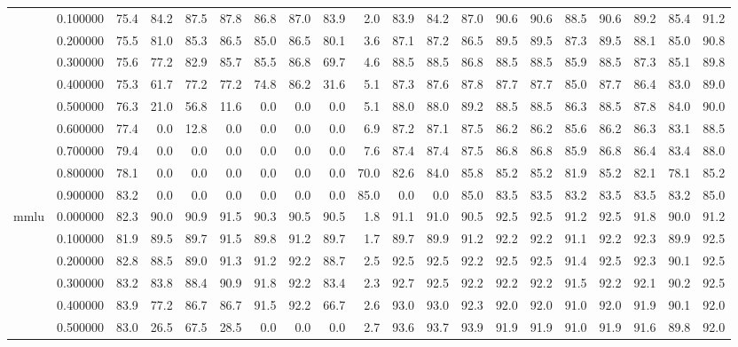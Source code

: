 \begin{tabular}{llrrrrrrrrrrrrrrrrrr}
 & 0.100000 & 75.4 & 84.2 & 87.5 & 87.8 & 86.8 & 87.0 & 83.9 & 2.0 & 83.9 & 84.2 & 87.0 & 90.6 & 90.6 & 88.5 & 90.6 & 89.2 & 85.4 & 91.2 \\
 & 0.200000 & 75.5 & 81.0 & 85.3 & 86.5 & 85.0 & 86.5 & 80.1 & 3.6 & 87.1 & 87.2 & 86.5 & 89.5 & 89.5 & 87.3 & 89.5 & 88.1 & 85.0 & 90.8 \\
 & 0.300000 & 75.6 & 77.2 & 82.9 & 85.7 & 85.5 & 86.8 & 69.7 & 4.6 & 88.5 & 88.5 & 86.8 & 88.5 & 88.5 & 85.9 & 88.5 & 87.3 & 85.1 & 89.8 \\
 & 0.400000 & 75.3 & 61.7 & 77.2 & 77.2 & 74.8 & 86.2 & 31.6 & 5.1 & 87.3 & 87.6 & 87.8 & 87.7 & 87.7 & 85.0 & 87.7 & 86.4 & 83.0 & 89.0 \\
 & 0.500000 & 76.3 & 21.0 & 56.8 & 11.6 & 0.0 & 0.0 & 0.0 & 5.1 & 88.0 & 88.0 & 89.2 & 88.5 & 88.5 & 86.3 & 88.5 & 87.8 & 84.0 & 90.0 \\
 & 0.600000 & 77.4 & 0.0 & 12.8 & 0.0 & 0.0 & 0.0 & 0.0 & 6.9 & 87.2 & 87.1 & 87.5 & 86.2 & 86.2 & 85.6 & 86.2 & 86.3 & 83.1 & 88.5 \\
 & 0.700000 & 79.4 & 0.0 & 0.0 & 0.0 & 0.0 & 0.0 & 0.0 & 7.6 & 87.4 & 87.4 & 87.5 & 86.8 & 86.8 & 85.9 & 86.8 & 86.4 & 83.4 & 88.0 \\
 & 0.800000 & 78.1 & 0.0 & 0.0 & 0.0 & 0.0 & 0.0 & 0.0 & 70.0 & 82.6 & 84.0 & 85.8 & 85.2 & 85.2 & 81.9 & 85.2 & 82.1 & 78.1 & 85.2 \\
 & 0.900000 & 83.2 & 0.0 & 0.0 & 0.0 & 0.0 & 0.0 & 0.0 & 85.0 & 0.0 & 0.0 & 85.0 & 83.5 & 83.5 & 83.2 & 83.5 & 83.5 & 83.2 & 85.0 \\
\cline{1-20}
\multirow[t]{10}{*}{mmlu} & 0.000000 & 82.3 & 90.0 & 90.9 & 91.5 & 90.3 & 90.5 & 90.5 & 1.8 & 91.1 & 91.0 & 90.5 & 92.5 & 92.5 & 91.2 & 92.5 & 91.8 & 90.0 & 91.2 \\
 & 0.100000 & 81.9 & 89.5 & 89.7 & 91.5 & 89.8 & 91.2 & 89.7 & 1.7 & 89.7 & 89.9 & 91.2 & 92.2 & 92.2 & 91.1 & 92.2 & 92.3 & 89.9 & 92.5 \\
 & 0.200000 & 82.8 & 88.5 & 89.0 & 91.3 & 91.2 & 92.2 & 88.7 & 2.5 & 92.5 & 92.5 & 92.2 & 92.5 & 92.5 & 91.4 & 92.5 & 92.3 & 90.1 & 92.5 \\
 & 0.300000 & 83.2 & 83.8 & 88.4 & 90.9 & 91.8 & 92.2 & 83.4 & 2.3 & 92.7 & 92.5 & 92.2 & 92.2 & 92.2 & 91.5 & 92.2 & 92.1 & 90.2 & 92.5 \\
 & 0.400000 & 83.9 & 77.2 & 86.7 & 86.7 & 91.5 & 92.2 & 66.7 & 2.6 & 93.0 & 93.0 & 92.3 & 92.0 & 92.0 & 91.0 & 92.0 & 91.9 & 90.1 & 92.0 \\
 & 0.500000 & 83.0 & 26.5 & 67.5 & 28.5 & 0.0 & 0.0 & 0.0 & 2.7 & 93.6 & 93.7 & 93.9 & 91.9 & 91.9 & 91.0 & 91.9 & 91.6 & 89.8 & 92.0 \\

\end{tabular}
